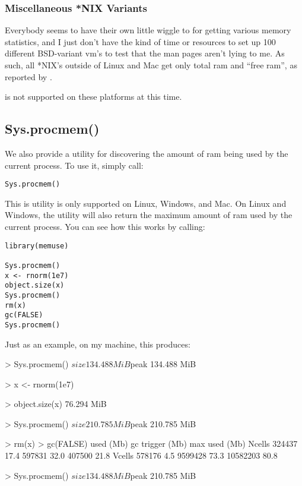 \subsubsection{Miscellaneous *NIX Variants}

Everybody seems to have their own little wiggle to  for getting 
various memory statistics, and I just don't have the kind of time or resources 
to set up 100 different BSD-variant vm's to test that the man pages aren't lying 
to me.  As such, all *NIX's outside of Linux and Mac get only total ram and 
``free ram'', as reported by .

 is not supported on these platforms at this time.




\subsection{Sys.procmem()}

We also provide a utility for discovering the amount of ram being used by the 
current \R process.  To use it, simply call:
\begin{lstlisting}[language=rr]
Sys.procmem()
\end{lstlisting}

This is utility is only supported on Linux, Windows, and Mac.  On Linux and 
Windows, the utility will also return the maximum amount of ram used by the 
current \R process.  You can see how this works by calling:

\begin{lstlisting}[language=rr]
library(memuse)

Sys.procmem()
x <- rnorm(1e7)
object.size(x)
Sys.procmem()
rm(x)
gc(FALSE)
Sys.procmem()
\end{lstlisting}

Just as an example, on my machine, this produces:
\vspace{-.6cm}
\begin{Output}
> Sys.procmem()
$size
134.488 MiB

$peak
134.488 MiB

> x <- rnorm(1e7)

> object.size(x)
76.294 MiB

> Sys.procmem()
$size
210.785 MiB

$peak
210.785 MiB

> rm(x)
> gc(FALSE)
         used (Mb) gc trigger (Mb) max used (Mb)
Ncells 324437 17.4     597831 32.0   407500 21.8
Vcells 578176  4.5    9599428 73.3 10582203 80.8

> Sys.procmem()
$size
134.488 MiB

$peak
210.785 MiB

\end{Output}
